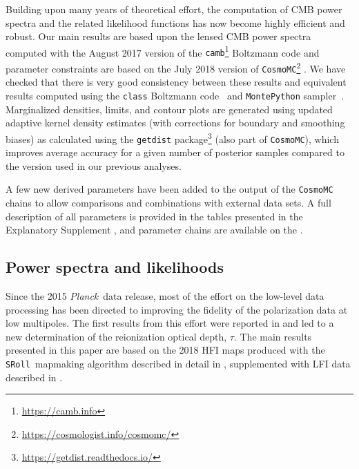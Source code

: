 \documentclass[longauth,traditabstract]{aa}
\def\Planck{\textit{Planck}}
\newcommand{\sroll}{\texttt{SRoll}}
\providecommand{\CAMB}{{\tt camb}}
\newcommand{\PLA}{\citetalias{PLA}}
\begin{document}
Building upon many years of theoretical effort, the computation of CMB power
spectra and the related likelihood functions has now become highly efficient and robust.
Our main results are based upon the lensed CMB power spectra computed
with the August 2017 version of the \CAMB\footnote{\url{https://camb.info}}
Boltzmann code \citep{Lewis:1999bs} and parameter constraints are based on the July 2018 version of {\tt CosmoMC}\footnote{\url{https://cosmologist.info/cosmomc/}} \citep{Lewis:2002ah,Lewis:2013hha}.
We have checked that there is very good consistency between these results and equivalent results computed  using the {\tt class} Boltzmann code~\citep{Blas:2011rf} and {\tt MontePython} sampler~\citep{Audren:2012wb,Brinckmann:2018cvx}.
Marginalized densities, limits, and contour plots are generated using updated adaptive kernel density estimates (with corrections for boundary and smoothing biases) as calculated using the {\tt getdist} package\footnote{\url{https://getdist.readthedocs.io/}} (also part of {\tt CosmoMC}), which improves average accuracy for a given number of posterior samples compared to the version used in our previous analyses.

A few new derived parameters have been added to the output of the {\tt CosmoMC} chains to allow comparisons and combinations with external data sets. A full description of all parameters is provided in
the tables presented in the Explanatory Supplement \citep{planck2016-ES}, and parameter chains are available on the \PLA.


\subsection{Power spectra and likelihoods}\label{sec:likelihood}
Since the 2015 \Planck\ data release, most of the effort on the low-level data
processing has been directed to improving the fidelity of the polarization data
at low multipoles. The first results from this effort were reported
in \citet{planck2014-a10} and led to a new determination of the reionization
optical depth, $\tau$.  The main results presented in this paper are
based on the 2018 HFI maps produced with the \sroll\ mapmaking algorithm
described in detail in \cite{planck2016-l03}, supplemented with LFI data
described in \citet{planck2016-l02}.
\end{document}
